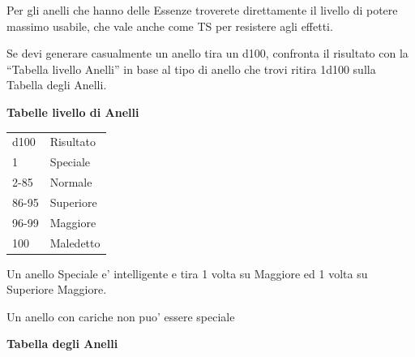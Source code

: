\documentclass[a4paper,11pt,twoside,openany]{dndbook}
\begin{document}
{Per gli anelli che hanno delle Essenze troverete direttamente il livello di potere massimo usabile, che vale anche come TS per resistere agli effetti.

Se devi generare casualmente un anello tira un d100, confronta il risultato con la ``Tabella livello Anelli'' in base al tipo di anello che trovi ritira 1d100 sulla Tabella degli Anelli.

\bigskip

\textbf{Tabelle livello di Anelli}

\begin{tabular}[c]{@{}ll@{}}
\toprule 
d100 & Risultato\tabularnewline
1 & Speciale\tabularnewline
2-85 & Normale\tabularnewline
86-95 & Superiore\tabularnewline
96-99 & Maggiore\tabularnewline
100 & Maledetto\tabularnewline
\bottomrule
\end{tabular}

\bigskip

Un anello Speciale e' intelligente e tira 1 volta su Maggiore ed 1 volta su Superiore Maggiore.

Un anello con cariche non puo' essere speciale

\bigskip

\textbf{Tabella degli Anelli}

}
\end{document}
